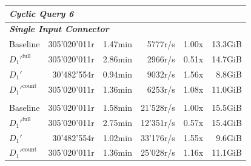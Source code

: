 \begin{longtable}{lrrrrr}
    \multicolumn{6}{l}{\textit{Cyclic Query 6}} \\
    \midrule
    \multicolumn{6}{l}{\textit{\textbf{Single Input Connector}}} \\
    \nopagebreak
    Baseline              &  305'020'011r         &  1.47min            &  5777r/s              & 1.00x             & 13.3GiB   \\
    $D_1'^{\text{full}}$   &  305'020'011r         &  2.86min            &  2966r/s              & 0.51x             & 14.7GiB   \\
    \quad $D_1'$           &  30'482'554r          &  0.94min            &  9032r/s              & 1.56x             & 8.8GiB    \\
    $D_1'^{\text{count}}$  &  305'020'011r         &  1.36min            &  6253r/s              & 1.08x             & 11.0GiB   \\
    \addlinespace 
    
    \multicolumn{6}{l}{\textit{\textbf{4 Input Connectors}}} \\
    \nopagebreak
    Baseline              &  305'020'011r         &  1.58min            &  21'528r/s            & 1.00x             & 15.5GiB   \\
    $D_1'^{\text{full}}$   &  305'020'011r         &  2.75min            &  12'351r/s            & 0.57x             & 15.4GiB   \\
    \quad $D_1'$           &  30'482'554r          &  1.02min            &  33'176r/s            & 1.55x             & 9.6GiB    \\ 
    $D_1'^{\text{count}}$  &  305'020'011r         &  1.36min            &  25'028r/s            & 1.16x             & 11.1GiB   \\

    \bottomrule

\end{longtable}

